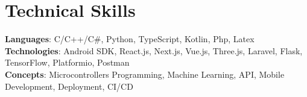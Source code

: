 \section{Technical Skills}
    \begin{itemize}[leftmargin=0.15in, label={}]
	\small{\item{
		\textbf{Languages}{: C/C++/C\#, Python, TypeScript, Kotlin, Php, Latex} \\
		\textbf{Technologies}{: Android SDK, React.js, Next.js, Vue.js, Three.js, Laravel, Flask, TensorFlow, Platformio, Postman} \\
		\textbf{Concepts}{: Microcontrollers Programming, Machine Learning, API, Mobile Development, Deployment, CI/CD}
	}}
    \end{itemize}